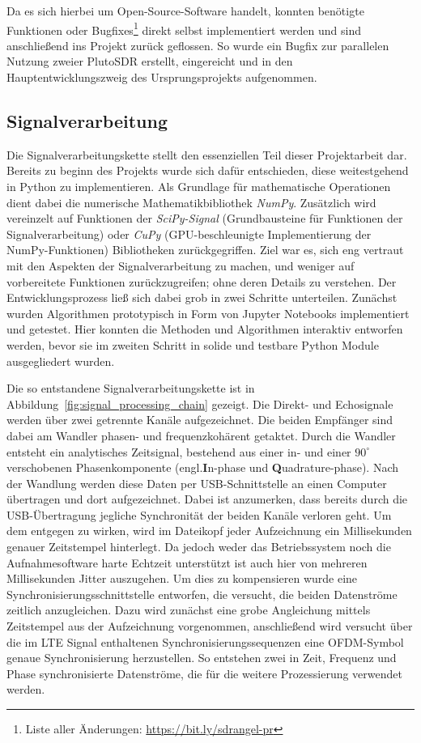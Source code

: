 Da es sich hierbei um Open-Source-Software handelt, konnten benötigte Funktionen oder Bugfixes\footnote{Liste aller Änderungen: \url{https://bit.ly/sdrangel-pr}} direkt selbst implementiert werden und sind anschließend ins Projekt zurück geflossen. So wurde ein Bugfix zur parallelen Nutzung zweier PlutoSDR erstellt, eingereicht und in den Hauptentwicklungszweig des Ursprungsprojekts aufgenommen.

\subsection{Signalverarbeitung}

Die Signalverarbeitungskette stellt den essenziellen Teil dieser Projektarbeit dar. Bereits zu beginn des Projekts wurde sich dafür entschieden, diese weitestgehend in Python zu implementieren. Als Grundlage für mathematische Operationen dient dabei die numerische Mathematikbibliothek \emph{NumPy}. Zusätzlich wird vereinzelt auf Funktionen der \emph{SciPy-Signal} (Grundbausteine für Funktionen der Signalverarbeitung) oder \emph{CuPy} (GPU-beschleunigte Implementierung der NumPy-Funktionen) Bibliotheken zurückgegriffen. Ziel war es, sich eng vertraut mit den Aspekten der Signalverarbeitung zu machen, und weniger auf vorbereitete Funktionen zurückzugreifen; ohne deren Details zu verstehen. Der Entwicklungsprozess ließ sich dabei grob in zwei Schritte unterteilen. Zunächst wurden Algorithmen prototypisch in Form von Jupyter Notebooks implementiert und getestet. Hier konnten die Methoden und Algorithmen interaktiv entworfen werden, bevor sie im zweiten Schritt in solide und testbare Python Module ausgegliedert wurden.

Die so entstandene Signalverarbeitungskette ist in Abbildung~\ref{fig:signal_processing_chain} gezeigt. Die Direkt- und Echosignale werden über zwei getrennte Kanäle aufgezeichnet. Die beiden Empfänger sind dabei am Wandler phasen- und frequenzkohärent getaktet. Durch die Wandler entsteht ein analytisches Zeitsignal, bestehend aus einer in- und einer \(90^\circ \) verschobenen Phasenkomponente %
(engl.\@ \textbf{I}n-phase und \textbf{Q}uadrature-phase). %
Nach der Wandlung werden diese Daten per USB-Schnittstelle an einen Computer übertragen und dort aufgezeichnet. Dabei ist anzumerken, dass bereits durch die USB-Übertragung jegliche Synchronität der beiden Kanäle verloren geht. Um dem entgegen zu wirken, wird im Dateikopf jeder Aufzeichnung ein Millisekunden genauer Zeitstempel hinterlegt. Da jedoch weder das Betriebssystem noch die Aufnahmesoftware harte Echtzeit unterstützt ist auch hier von mehreren Millisekunden Jitter auszugehen. Um dies zu kompensieren wurde eine Synchronisierungsschnittstelle entworfen, die versucht, die beiden Datenströme zeitlich anzugleichen. Dazu wird zunächst eine grobe Angleichung mittels Zeitstempel aus der Aufzeichnung vorgenommen, anschließend wird versucht über die im LTE Signal enthaltenen Synchronisierungssequenzen eine OFDM-Symbol genaue Synchronisierung herzustellen. So entstehen zwei in Zeit, Frequenz und Phase synchronisierte Datenströme, die für die weitere Prozessierung verwendet werden.


